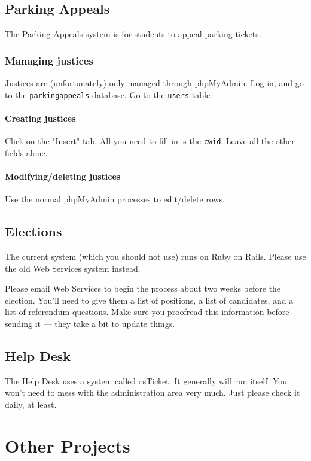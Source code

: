 \documentclass[11pt]{report}
\begin{document}
	\section{Parking Appeals}
		The Parking Appeals system is for students to appeal parking tickets.
		
		\subsection{Managing justices}
			Justices are (unfortunately) only managed through phpMyAdmin. Log in, and go to the \texttt{parkingappeals} database. Go to the \texttt{users} table.
			
			\subsubsection{Creating justices}
				Click on the "Insert" tab. All you need to fill in is the \texttt{cwid}. Leave all the other fields alone.
			
			\subsubsection{Modifying/deleting justices}
				Use the normal phpMyAdmin processes to edit/delete rows.

	\section{Elections}
		The current system (which you should not use) runs on Ruby on Rails. Please use the old Web Services system instead.
		
		Please email Web Services to begin the process about two weeks before the election. You'll need to give them a list of positions, a list of candidates, and a list of referendum questions. Make sure you proofread this information before sending it --- they take a bit to update things.

	\section{Help Desk}
		The Help Desk uses a system called osTicket. It generally will run itself. You won't need to mess with the administration area very much. Just please check it daily, at least.

\chapter{Other Projects}
\end{document}
